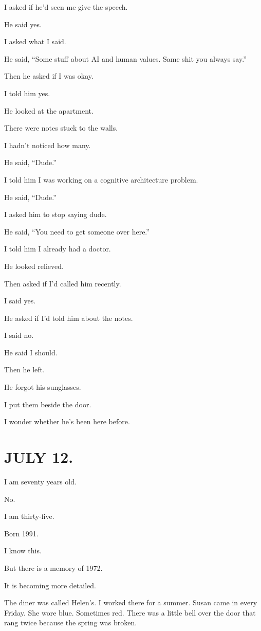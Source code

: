\documentclass[11pt,oneside]{book}
\begin{document}
I asked if he'd seen me give the speech.

He said yes.

I asked what I said.

He said, ``Some stuff about AI and human values. Same shit you always say.''

Then he asked if I was okay.

I told him yes.

He looked at the apartment.

There were notes stuck to the walls.

I hadn't noticed how many.

He said, ``Dude.''

I told him I was working on a cognitive architecture problem.

He said, ``Dude.''

I asked him to stop saying dude.

He said, ``You need to get someone over here.''

I told him I already had a doctor.

He looked relieved.

Then asked if I'd called him recently.

I said yes.

He asked if I'd told him about the notes.

I said no.

He said I should.

Then he left.

He forgot his sunglasses.

I put them beside the door.

I wonder whether he's been here before.

\section*{JULY 12.}

I am seventy years old.

No.

I am thirty-five.

Born 1991.

I know this.

But there is a memory of 1972.

It is becoming more detailed.

The diner was called Helen's. I worked there for a summer. Susan came in every Friday. She wore blue. Sometimes red. There was a little bell over the door that rang twice because the spring was broken.
\end{document}
